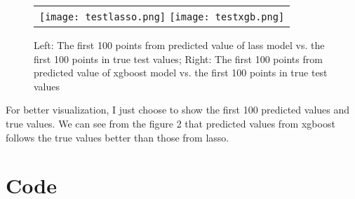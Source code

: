 \documentclass[12pt]{article}
\begin{document}
\begin{figure}[htbp]
\begin{center}
\hspace*{-40pt}
\begin{tabular}{c}
\texttt{[image: testlasso.png]} 
\hspace*{-20pt}
\texttt{[image: testxgb.png]}
\end{tabular}
\end{center}
\caption{Left: The first 100 points from predicted value of lass model vs. the first 100 points in true test values; Right: The first 100 points from predicted value of xgboost model vs. the first 100 points in true test values}
\label{fig: sobol}
\end{figure}

For better visualization, I just choose to show the first 100 predicted values and true values. We can see from the figure 2 that predicted values from xgboost follows the true values better than those from lasso.

\section{Code}
\end{document}
